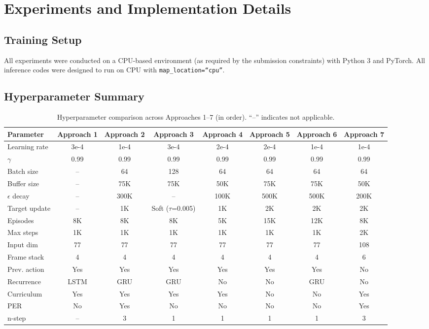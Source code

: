 \documentclass[10.5pt, oneside]{article}
\begin{document}
\section{Experiments and Implementation Details}

\subsection{Training Setup}

All experiments were conducted on a CPU-based environment (as required by the submission constraints) with Python 3 and PyTorch. All inference codes were designed to run on CPU with \texttt{map\_location=``cpu''}.

\subsection{Hyperparameter Summary}

\begin{table}[H]
    \centering
    \small
    \begin{tabular}{l c c c c c c c}
    \toprule
    \textbf{Parameter} & \textbf{Approach 1} & \textbf{Approach 2} & \textbf{Approach 3} & \textbf{Approach 4} & \textbf{Approach 5} & \textbf{Approach 6} & \textbf{Approach 7} \\
    \midrule
    Learning rate & 3e-4 & 1e-4 & 3e-4 & 2e-4 & 2e-4 & 1e-4 & 1e-4 \\
    $\gamma$ & 0.99 & 0.99 & 0.99 & 0.99 & 0.99 & 0.99 & 0.99 \\
    Batch size & -- & 64 & 128 & 64 & 64 & 64 & 64 \\
    Buffer size & -- & 75K & 75K & 50K & 75K & 75K & 50K \\
    $\epsilon$ decay & -- & 300K & -- & 100K & 500K & 500K & 200K \\
    Target update & -- & 1K & Soft ($\tau$=0.005) & 1K & 2K & 2K & 2K \\
    Episodes & 8K & 8K & 8K & 5K & 15K & 12K & 8K \\
    Max steps & 1K & 1K & 1K & 1K & 1K & 1K & 2K \\
    Input dim & 77 & 77 & 77 & 77 & 77 & 77 & 108 \\
    Frame stack & 4 & 4 & 4 & 4 & 4 & 4 & 6 \\
    Prev. action & Yes & Yes & Yes & Yes & Yes & Yes & No \\
    Recurrence & LSTM & GRU & GRU & No & No & GRU & No \\
    Curriculum & Yes & Yes & Yes & Yes & No & No & Yes \\
    PER & No & Yes & No & No & No & No & Yes \\
    n-step & -- & 3 & 1 & 1 & 1 & 1 & 3 \\
    \bottomrule
    \end{tabular}
    \caption{Hyperparameter comparison across Approaches 1--7 (in order). ``--'' indicates not applicable.}
    \label{tab:hyperparams}
    \end{table}
\end{document}
